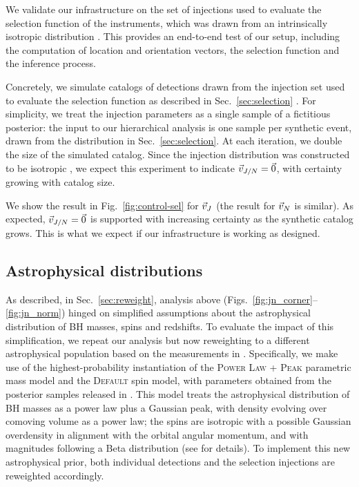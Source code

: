 \documentclass[twocolumn,twocolappendix,linenumbers]{aastex631}
\begin{document}
We validate our infrastructure on the set of injections used to evaluate the selection function of the instruments, which was drawn from an intrinsically isotropic distribution \citep{o3-selection}.
This provides an end-to-end test of our setup, including the computation of location and orientation vectors, the selection function and the inference process.

Concretely, we simulate catalogs of detections drawn from the injection set used to evaluate the selection function as described in Sec.~\ref{sec:selection} \citep{o3-selection}.
For simplicity, we treat the injection parameters as a single sample of a fictitious posterior: the input to our hierarchical analysis is one sample per synthetic event, drawn from the distribution in Sec.~\ref{sec:selection}.
At each iteration, we double the size of the simulated catalog.
Since the injection distribution was constructed to be isotropic \citep{o3-selection}, we expect this experiment to indicate $\vec{v}_{J/N} = \vec{0}$, with certainty growing with catalog size.

We show the result in Fig.~\ref{fig:control-sel} for $\vec{v}_{J}$ (the result for $\vec{v}_{N}$ is similar).
As expected, $\vec{v}_{J/N} = \vec{0}$ is supported with increasing certainty as the synthetic catalog grows.
This is what we expect if our infrastructure is working as designed.

\subsection{Astrophysical distributions}
\label{sec:validation:rates}

As described, in Sec.~\ref{sec:reweight}, analysis above (Figs.~\ref{fig:jn_corner}--\ref{fig:jn_norm}) hinged on simplified assumptions about the astrophysical distribution of \ac{BH} masses, spins and redshifts.
To evaluate the impact of this simplification, we repeat our analysis but now reweighting to a different astrophysical population based on the measurements in \citet{LIGOScientific:2021psn}.
Specifically, we make use of the highest-probability instantiation of the \textsc{Power Law + Peak} parametric mass model and the \textsc{Default} spin model, with parameters obtained from the posterior samples released in \citet{rpdata}.
This model treats the astrophysical distribution of \ac{BH} masses as a power law plus a Gaussian peak, with density evolving over comoving volume as a power law; the spins are isotropic with a possible Gaussian overdensity in alignment with the orbital angular momentum, and with magnitudes following a Beta distribution (see \citep{LIGOScientific:2021psn} for details).
To implement this new astrophysical prior, both individual detections and the selection injections are reweighted accordingly.
\end{document}
